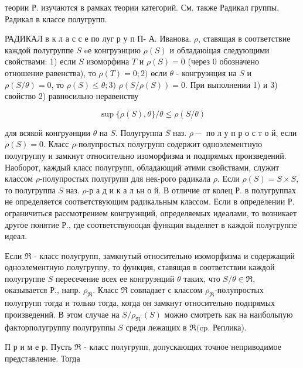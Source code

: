 \documentclass[10pt]{article}
\begin{document}
теории Р. изучаются в рамках теории категорий. См. также Радикал группы, Радикал в классе полугрупп.



РАДИКАЛ в к л а с с е по луг р у п П- А. Иванова. $\rho$, ставящая в соответствие каждой полугруппе $S$ eе конгруэнцию $\rho(S)$ и обладаюіцая следующими свойствами: 1) если $S$ изоморфина $T$ и $\rho(S)=0$ (через 0 обозначено отношение равенства), то $\rho(T)=0 ; 2)$ өсли $\theta$ - конгруэнция на $S$ и $\rho(S / \theta)=0$, то $\rho(S) \leqslant \theta ; 3)$ $\rho(S / \rho(S))=0$. При выполнении 1) и 3) свойство 2) равносильно неравенству



\[

\sup \{\rho(S), \theta\} / \theta \leqslant \rho(S / \theta)

\]



для всякой конгруәнции $\theta$ на $S$. Полугруппа $S$ наз. $\rho-$ по л у п р о с т о й, если $\rho(S)=0$. Класс $\rho$-полупростых полугрупп содержит одноэлементную полугруппу и замкнут относительно изоморфизма и подпрямых произведений. Наоборот, каждый класс полугрупп, обладающий әтими свойствами, служит классом $\rho$-полупростых полугрупп для нек-рого радикала $\rho$. Если $\rho(S)=S \times S$, то полугруппа $S$ наз. $\rho$-р а д и к а л ьн о й. В отличие от колец Р. в полугруппах не определяется соответствующим радикальным классом. Если в определении Р. ограничиться рассмотрением конгруэнций, определяемых идеалами, то возникает другое понятие Р., где соответствуюоцая функция выделяет в каждой полугруппе идеал.



Если $\Re$ - класс полугрупп, замкнутый относительно изоморфизма и содержащий одноэлементную полугруппу, то функция, ставящая в соответствии каждой полугруппе $S$ пересечение всех ее конгруэнций $\theta$ таких, что $S / \theta \in \Re$, оказывается Р., напр. $\rho_{\mathfrak{R}}$. Класс $\Re$ совпадает с классом $\rho_{\mathfrak{R}}$-полупростых полугрупп тогда и только тогда, когда он замкнут относительно подпрямых произведений. В этом случае на $S / \rho_{\Re^{\prime}}(S)$ можно смотреть как на наибольпую факторполугруппу полугруппы $S$ среди лежащих в $\Re(\mathrm{cp}$. Реплика).



П р и м е р. Пусть $\Re$ - класс полугрупп, допускающих точное неприводимое представление. Тогда
\end{document}
